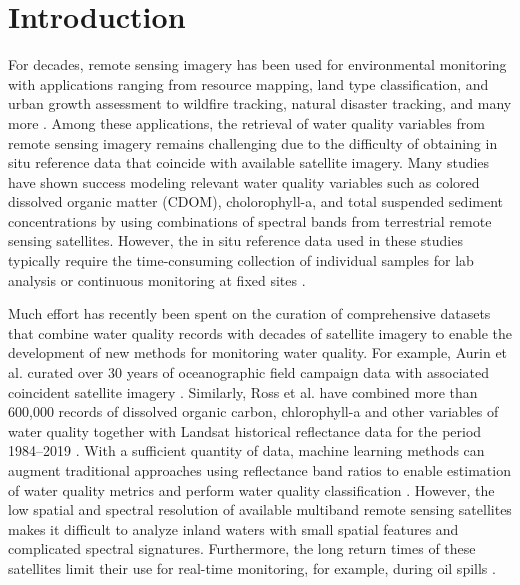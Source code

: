 \documentclass[remotesensing,article,submit,pdftex,moreauthors]{Definitions/mdpi}
\begin{document}
\section{Introduction}

For decades, remote sensing imagery has been used for environmental monitoring with applications ranging from resource mapping, land type classification, and urban growth assessment to wildfire tracking, natural disaster tracking, and many more \cite{cohen2004landsat, melesse2007remote, allison2016airborne, joyce2009review, robert2017analysis}. Among these applications, the retrieval of water quality variables from remote sensing imagery remains challenging due to the difficulty of obtaining in situ reference data that coincide with available satellite imagery. Many studies have shown success modeling relevant water quality variables such as colored dissolved organic matter (CDOM), cholorophyll-a, and total suspended sediment concentrations by using combinations of spectral bands from terrestrial remote sensing satellites. However, the in situ reference data used in these studies typically require the time-consuming collection of individual samples for lab analysis or continuous monitoring at fixed sites \cite{brezonik2005landsat, paavel2011optical, gursoy2019investigating, bonansea2019using, sagan2020monitoring, remote-sensing-finland}. 

Much effort has recently been spent on the curation of comprehensive datasets that combine water quality records with decades of satellite imagery to enable the development of new methods for monitoring water quality. For example, Aurin et al. curated over 30 years of oceanographic field campaign data with associated coincident satellite imagery \cite{aurin2018remote}. Similarly, Ross et al. have combined more than 600,000 records of dissolved organic carbon, chlorophyll-a and other variables of water quality together with Landsat historical reflectance data for the period 1984--2019 \cite{ross2019aquasat}. With a sufficient quantity of data, machine learning methods can augment traditional approaches using reflectance band ratios to enable estimation of water quality metrics and perform water quality classification \cite{schiller1999neural, brown2008neural, lary2010artificial, feng2015urban,belgiu2016random}. However, the low spatial and spectral resolution of available multiband remote sensing satellites makes it difficult to analyze inland waters with small spatial features and complicated spectral signatures. Furthermore, the long return times of these satellites limit their use for real-time monitoring, for example, during oil spills \cite{fingas2017review}.
\end{document}
